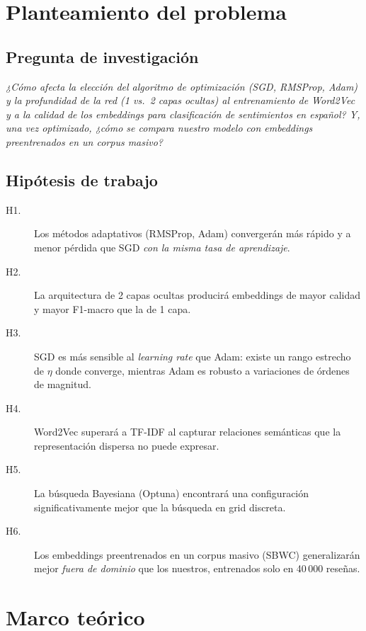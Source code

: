 \documentclass[11pt]{article}
\begin{document}
\section{Planteamiento del problema}

\subsection{Pregunta de investigación}
\emph{¿Cómo afecta la elección del algoritmo de optimización (SGD, RMSProp, Adam) y la
profundidad de la red (1 vs.\ 2 capas ocultas) al entrenamiento de Word2Vec y a la calidad
de los embeddings para clasificación de sentimientos en español? Y, una vez optimizado,
¿cómo se compara nuestro modelo con embeddings preentrenados en un corpus masivo?}

\subsection{Hipótesis de trabajo}
\begin{description}
  \item[H1.] Los métodos adaptativos (RMSProp, Adam) convergerán más rápido y a menor
  pérdida que SGD \emph{con la misma tasa de aprendizaje}.
  \item[H2.] La arquitectura de 2 capas ocultas producirá embeddings de mayor calidad y
  mayor F1-macro que la de 1 capa.
  \item[H3.] SGD es más sensible al \emph{learning rate} que Adam: existe un rango estrecho
  de $\eta$ donde converge, mientras Adam es robusto a variaciones de órdenes de magnitud.
  \item[H4.] Word2Vec superará a TF-IDF al capturar relaciones semánticas que la
  representación dispersa no puede expresar.
  \item[H5.] La búsqueda Bayesiana (Optuna) encontrará una configuración significativamente
  mejor que la búsqueda en grid discreta.
  \item[H6.] Los embeddings preentrenados en un corpus masivo (SBWC) generalizarán mejor
  \emph{fuera de dominio} que los nuestros, entrenados solo en 40\,000 reseñas.
\end{description}

\section{Marco teórico}\label{sec:teoria}
\end{document}
